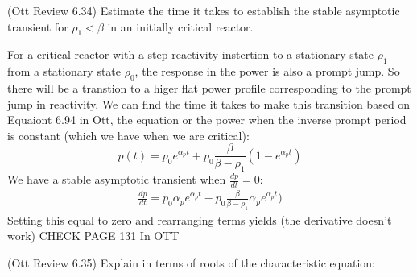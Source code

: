\documentclass[11pt,addpoints,answers]{exam}
\begin{document}
\begin{questions}
        \question (Ott Review 6.34) Estimate the time it takes to establish the 
        stable asymptotic transient for $\rho_1 < \beta$ in an initially 
        critical reactor.
                \begin{solution}
                    For a critical reactor with a step reactivity instertion to
                    a stationary state $\rho_{1}$ from a stationary state
                    $\rho_{0}$, the response in the power is also a prompt jump.
                    So there will be a transtion to a higer flat power
                    profile corresponding to the prompt jump in reactivity. We
                    can find the time it takes to make this transition based on
                    Equaiont 6.94 in Ott, the equation or the power when the
                    inverse prompt period is constant (which we have when we are
                    critical):
                    \begin{equation}
                        p(t) = p_0 e^{\alpha_{p} t} + p_0 \frac{\beta}{\beta -
                        \rho_1} (1 - e^{\alpha_{p} t})
                    \end{equation}
                    We have a stable asymptotic transient when $\frac{dp}{dt} =
                    0$:
                    \begin{align*}
                        \frac{dp}{dt} = p_0 \alpha_p e^{\alpha_p t} - p_0 \frac{\beta}{\beta -
                        \rho_1} \alpha_{p} e^{\alpha_{p} t})
                    \end{align*}
                    Setting this equal to zero and rearranging terms yields
                    (the derivative doesn't work)
                    CHECK PAGE 131 In OTT
                \end{solution}


        \question[10] (Ott Review 6.35) Explain in terms of roots of the 
        characteristic equation:
\end{questions}
\end{document}
